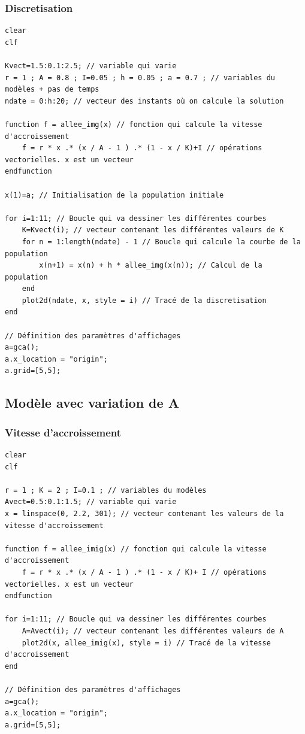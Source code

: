 \documentclass{article}
\begin{document}
\subsubsection{Discretisation}

\begin{verbatim}
clear
clf

Kvect=1.5:0.1:2.5; // variable qui varie
r = 1 ; A = 0.8 ; I=0.05 ; h = 0.05 ; a = 0.7 ; // variables du modèles + pas de temps
ndate = 0:h:20; // vecteur des instants où on calcule la solution

function f = allee_img(x) // fonction qui calcule la vitesse d'accroissement
    f = r * x .* (x / A - 1 ) .* (1 - x / K)+I // opérations vectorielles. x est un vecteur
endfunction

x(1)=a; // Initialisation de la population initiale

for i=1:11; // Boucle qui va dessiner les différentes courbes
    K=Kvect(i); // vecteur contenant les différentes valeurs de K
    for n = 1:length(ndate) - 1 // Boucle qui calcule la courbe de la population
        x(n+1) = x(n) + h * allee_img(x(n)); // Calcul de la population
    end 
    plot2d(ndate, x, style = i) // Tracé de la discretisation
end

// Définition des paramètres d'affichages
a=gca();
a.x_location = "origin";
a.grid=[5,5];
\end{verbatim}

\subsection{Modèle avec variation de A}

\subsubsection{Vitesse d'accroissement}

\begin{verbatim}
clear
clf

r = 1 ; K = 2 ; I=0.1 ; // variables du modèles
Avect=0.5:0.1:1.5; // variable qui varie
x = linspace(0, 2.2, 301); // vecteur contenant les valeurs de la vitesse d'accroissement

function f = allee_imig(x) // fonction qui calcule la vitesse d'accroissement
    f = r * x .* (x / A - 1 ) .* (1 - x / K)+ I // opérations vectorielles. x est un vecteur
endfunction

for i=1:11; // Boucle qui va dessiner les différentes courbes
    A=Avect(i); // vecteur contenant les différentes valeurs de A
    plot2d(x, allee_imig(x), style = i) // Tracé de la vitesse d'accroissement
end

// Définition des paramètres d'affichages
a=gca();
a.x_location = "origin";
a.grid=[5,5];
\end{verbatim}
\end{document}
